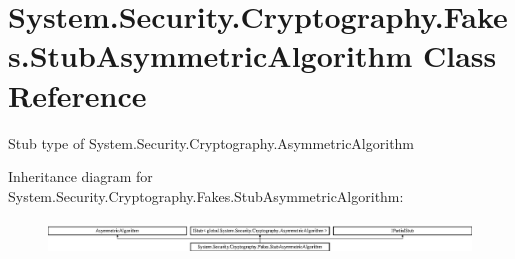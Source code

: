 \hypertarget{class_system_1_1_security_1_1_cryptography_1_1_fakes_1_1_stub_asymmetric_algorithm}{\section{System.\-Security.\-Cryptography.\-Fakes.\-Stub\-Asymmetric\-Algorithm Class Reference}
\label{class_system_1_1_security_1_1_cryptography_1_1_fakes_1_1_stub_asymmetric_algorithm}
}


Stub type of System.\-Security.\-Cryptography.\-Asymmetric\-Algorithm 


Inheritance diagram for System.\-Security.\-Cryptography.\-Fakes.\-Stub\-Asymmetric\-Algorithm\-:\begin{figure}[H]
\begin{center}
\leavevmode
\includegraphics[height=0.921811cm]{class_system_1_1_security_1_1_cryptography_1_1_fakes_1_1_stub_asymmetric_algorithm}
\end{center}
\end{figure}

